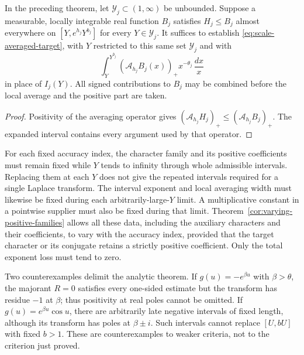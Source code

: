 \begin{corollary}
\label{cor:averaged-arithmetic-budget}
In the preceding theorem, let $\mathcal Y_j\subset(1,\infty)$ be
unbounded. Suppose a measurable, locally integrable real function $B_j$
satisfies $H_j\le B_j$ almost everywhere on
$[Y,e^{h_j}Y^{b_j}]$ for every $Y\in\mathcal Y_j$.
It suffices to establish \eqref{eq:scale-averaged-target}, with $Y$
restricted to this same set $\mathcal Y_j$ and with
\[
 \int_Y^{Y^{b_j}}(\mathcal A_{h_j}B_j(x))_+
                         x^{-\theta_j}\,\frac{dx}{x}
\]
in place of $I_j(Y)$. All signed contributions to $B_j$ may be
combined before the local average and the positive part are taken.
\end{corollary}

\begin{proof}
Positivity of the averaging operator gives
$(\mathcal A_{h_j}H_j)_+\le(\mathcal A_{h_j}B_j)_+$.
The expanded interval contains every argument used by that operator.
\end{proof}

\begin{remark}
For each fixed accuracy index, the character family and its positive
coefficients must remain fixed while $Y$ tends to infinity through
whole admissible intervals. Replacing them at each $Y$ does not give
the repeated intervals required for a single Laplace transform.
The interval exponent and local averaging width must likewise be fixed
during each arbitrarily-large-$Y$ limit. A multiplicative constant in a
pointwise supplier must also be fixed during that limit.
Theorem~\ref{cor:varying-positive-families} allows all these data,
including the auxiliary characters and their coefficients, to vary
with the accuracy index, provided that the target character or its
conjugate retains a strictly positive coefficient. Only the total
exponent loss must tend to zero.

Two counterexamples delimit the analytic theorem. If
$g(u)=-e^{\beta u}$ with $\beta>\theta$, the majorant $R=0$ satisfies
every one-sided estimate but the transform has residue $-1$ at
$\beta$; thus positivity at real poles cannot be omitted.
If $g(u)=e^{\beta u}\cos u$, there are arbitrarily late negative
intervals of fixed length, although its transform has poles at
$\beta\pm i$. Such intervals cannot replace $[U,bU]$ with fixed
$b>1$. These are counterexamples to weaker criteria, not to the
criterion just proved.
\end{remark}




